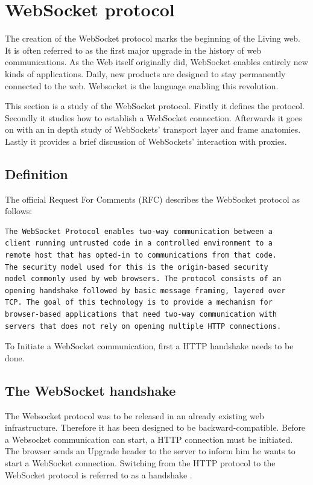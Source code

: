 \section{WebSocket protocol}

The creation of the WebSocket protocol marks the beginning of the Living web.
It is often referred to as the first major upgrade in the history of web
communications. As the Web itself originally did, WebSocket enables entirely
new kinds of applications. Daily, new products are designed to stay permanently
connected to the web. Websocket is the language enabling this revolution.

This section is a study of the WebSocket protocol. Firstly it defines the
protocol. Secondly it studies how to establish a WebSocket connection.
Afterwards it goes on with an in depth study of WebSockets' transport layer and
frame anatomies. Lastly it provides a brief discussion of WebSockets'
interaction with proxies.

\subsection{Definition}

The official Request For Comments \citep{Reference12} (RFC) describes the
WebSocket protocol as follows:

\begin{verbatim}
The WebSocket Protocol enables two-way communication between a 
client running untrusted code in a controlled environment to a 
remote host that has opted-in to communications from that code.
The security model used for this is the origin-based security 
model commonly used by web browsers. The protocol consists of an
opening handshake followed by basic message framing, layered over
TCP. The goal of this technology is to provide a mechanism for
browser-based applications that need two-way communication with
servers that does not rely on opening multiple HTTP connections.
\end{verbatim}

To Initiate a WebSocket communication, first a HTTP handshake needs to be done.

\subsection{The WebSocket handshake}

The Websocket protocol was to be released in an already existing web
infrastructure. Therefore it has been designed to be backward-compatible. Before
a Websocket communication can start, a HTTP connection must be initiated. The
browser sends an Upgrade header to the server to inform him he wants to start a
WebSocket connection. Switching from the HTTP protocol to the WebSocket
protocol is referred to as a handshake \citep{Reference12}.


